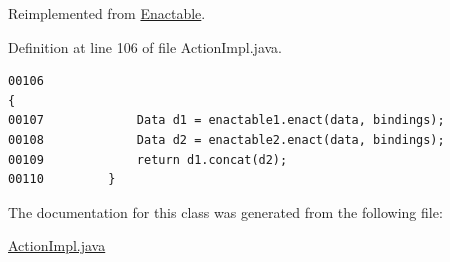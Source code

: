 Reimplemented from \hyperlink{interfaceEnactable_a0}{Enactable}.

Definition at line 106 of file Action\-Impl.java.\footnotesize\begin{verbatim}00106                                                                                    {
00107             Data d1 = enactable1.enact(data, bindings);
00108             Data d2 = enactable2.enact(data, bindings);
00109             return d1.concat(d2);
00110         }
\end{verbatim}\normalsize 


The documentation for this class was generated from the following file:\begin{CompactItemize}
\item 
\hyperlink{ActionImpl_8java-source}{Action\-Impl.java}\end{CompactItemize}
